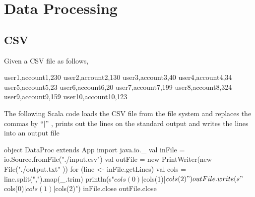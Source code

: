\documentclass[10pt]{article}
\newcommand{\comment}[1]{}
\begin{document}
\comment{
\subsection{Sample Answer}

\begin{code}
sealed trait Exp
case class Val(v:Int) extends Exp
case class Plus(e1:Exp, e2:Exp) extends Exp
case class Minus(e1:Exp, e2:Exp) extends Exp
case class Mult(e1:Exp, e2:Exp) extends Exp
case class Div(e1:Exp, e2:Exp) extends Exp

def simp(e:Exp):Exp = e match
{
        case Val(v)            => e
        case Plus(Val(0), e2)  => e2
        case Plus(e1, Val(0))  => e1
        case Plus(e1,e2)       => Plus(simp(e1), simp(e2))
        case Minus(e1, Val(0)) => e1
        case Minus(e1, e2)     => Minus(simp(e1), simp(e2))
        case Mult(Val(1), e2)  => e2
        case Mult(e1, Val(1))  => e1
        case Mult(e1, e2)      => Mult(simp(e1), simp(e2))
        case Div(e1, Val(1))   => e1
        case Div(e1, e2)       => Div(simp(e1), simp(e2))
}

def simpFix(e:Exp):Exp =
{
        val e2 = simp(e)
        if (e == e2)
        {
                e
        }
        else
        {
                simpFix(e2)
        }
}
\end{code}
}




\section{Data Processing}

\subsection{CSV}

Given a CSV file as follows,
\begin{code}
user1,account1,230
user2,account2,130
user3,account3,40
user4,account4,34
user5,account5,23
user6,account6,20
user7,account7,199
user8,account8,324
user9,account9,159
user10,account10,123
\end{code}

The following Scala code loads the CSV file from the file system and
replaces the commas by ``$|$'' , prints out the lines on the standard
output and writes the lines into an output file

\begin{code}
object DataProc extends App {
  import java.io._
  val inFile = io.Source.fromFile("./input.csv")
  val outFile = new PrintWriter(new File("./output.txt" ))
  for (line <- inFile.getLines) {
    val cols = line.split(",").map(_.trim)
    println(s"${cols(0)}|${cols(1)}|${cols(2)}")
    outFile.write(s"${cols(0)}|${cols(1)}|${cols(2)}\n")
  }
  inFile.close
  outFile.close
}
\end{code}
\end{document}
